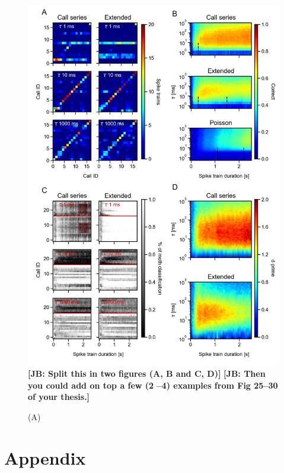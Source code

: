 \documentclass[12pt,a4paper]{article}
\newcommand{\note}[2][]{\textbf{[#1: #2]}}
\newcommand{\notejb}[1]{\note[JB]{#1}}
\begin{document}
\begin{figure}[h!]
	\centering
	\includegraphics{figures/Fig_03.jpeg}
        \notejb{Split this in two figures (A, B and C, D)}
        \notejb{Then you could add on top a few (2 --4) examples from Fig 25--30 of your thesis.}
	\caption{\label{fig:03}(A)}
\end{figure}

\newpage
\section{Appendix}
\end{document}
